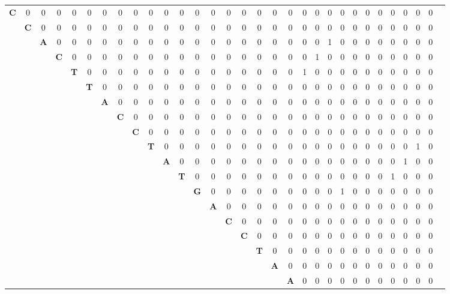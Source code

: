 \documentclass[a2paper,landscape]{article}
\begin{document}
        
        \begin{tabular}{ c c c c c c c c c c c c c c c c c c c c c c c c c c c c c c c|} 
 \hline 
\textbf{C} &0 &0 &0 &0 &0 &0 &0 &0 &0 &0 &0 &0 &0 &0 &0 &0 &0 &0 &0 &0 &0 &0 &0 &0 &0 &0 &0 &0 &0 
 \\  
&\textbf{C} &0 &0 &0 &0 &0 &0 &0 &0 &0 &0 &0 &0 &0 &0 &0 &0 &0 &0 &0 &0 &0 &0 &0 &0 &0 &0 &0 &0 
 \\  
&&\textbf{A} &0 &0 &0 &0 &0 &0 &0 &0 &0 &0 &0 &0 &0 &0 &0 &0 &0 &0 &\cellcolor{blue!25} 1 &0 &0 &0 &0 &0 &0 &0 &0 
 \\  
&&&\textbf{C} &0 &0 &0 &0 &0 &0 &0 &0 &0 &0 &0 &0 &0 &0 &0 &0 &\cellcolor{blue!25} 1 &0 &0 &0 &0 &0 &0 &0 &0 &0 
 \\  
&&&&\textbf{T} &0 &0 &0 &0 &0 &0 &0 &0 &0 &0 &0 &0 &0 &0 &\cellcolor{blue!25} 1 &0 &0 &0 &0 &0 &0 &0 &0 &0 &0 
 \\  
&&&&&\textbf{T} &0 &0 &0 &0 &0 &0 &0 &0 &0 &0 &0 &0 &0 &0 &0 &0 &0 &0 &0 &0 &0 &0 &0 &0 
 \\  
&&&&&&\textbf{A} &0 &0 &0 &0 &0 &0 &0 &0 &0 &0 &0 &0 &0 &0 &0 &0 &0 &0 &0 &0 &0 &0 &0 
 \\  
&&&&&&&\textbf{C} &0 &0 &0 &0 &0 &0 &0 &0 &0 &0 &0 &0 &0 &0 &0 &0 &0 &0 &0 &0 &0 &0 
 \\  
&&&&&&&&\textbf{C} &0 &0 &0 &0 &0 &0 &0 &0 &0 &0 &0 &0 &0 &0 &0 &0 &0 &0 &0 &0 &0 
 \\  
&&&&&&&&&\textbf{T} &0 &0 &0 &0 &0 &0 &0 &0 &0 &0 &0 &0 &0 &0 &0 &0 &0 &0 &\cellcolor{blue!25} 1 &0 
 \\  
&&&&&&&&&&\textbf{A} &0 &0 &0 &0 &0 &0 &0 &0 &0 &0 &0 &0 &0 &0 &0 &0 &\cellcolor{blue!25} 1 &0 &0 
 \\  
&&&&&&&&&&&\textbf{T} &0 &0 &0 &0 &0 &0 &0 &0 &0 &0 &0 &0 &0 &0 &\cellcolor{blue!25} 1 &0 &0 &0 
 \\  
&&&&&&&&&&&&\textbf{G} &0 &0 &0 &0 &0 &0 &0 &0 &0 &\cellcolor{blue!25} 1 &0 &0 &0 &0 &0 &0 &0 
 \\  
&&&&&&&&&&&&&\textbf{A} &0 &0 &0 &0 &0 &0 &0 &0 &0 &0 &0 &0 &0 &0 &0 &0 
 \\  
&&&&&&&&&&&&&&\textbf{C} &0 &0 &0 &0 &0 &0 &0 &0 &0 &0 &0 &0 &0 &0 &0 
 \\  
&&&&&&&&&&&&&&&\textbf{C} &0 &0 &0 &0 &0 &0 &0 &0 &0 &0 &0 &0 &0 &0 
 \\  
&&&&&&&&&&&&&&&&\textbf{T} &0 &0 &0 &0 &0 &0 &0 &0 &0 &0 &0 &0 &0 
 \\  
&&&&&&&&&&&&&&&&&\textbf{A} &0 &0 &0 &0 &0 &0 &0 &0 &0 &0 &0 &0 
 \\  
&&&&&&&&&&&&&&&&&&\textbf{A} &0 &0 &0 &0 &0 &0 &0 &0 &0 &0 &0 

\end{tabular}
\end{document}
